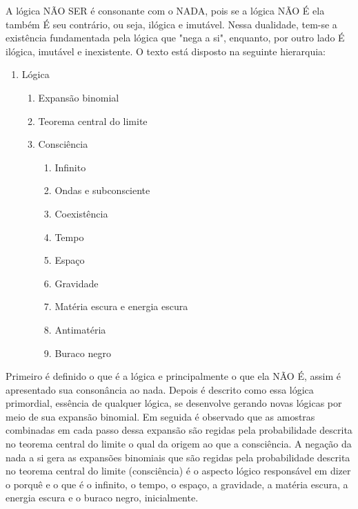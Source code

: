 A lógica NÃO SER é consonante com o NADA, pois se a lógica NÃO É ela também É seu contrário, ou seja, ilógica e imutável. Nessa dualidade, tem-se a existência fundamentada pela lógica que "nega a si", enquanto, por outro lado É ilógica, imutável e inexistente. O texto está disposto na seguinte hierarquia:
{\small
\begin{enumerate}[label*=\arabic*.]
   \item Lógica
   \begin{enumerate}[label*=\arabic*.]
	   \item Expansão binomial
	   \item Teorema central do limite
	   \item Consciência
		   \begin{enumerate}[label*=\arabic*.]
			   \item Infinito
			   \item Ondas e subconsciente
			   \item Coexistência
			   \item Tempo
			   \item Espaço
			   \item Gravidade
			   \item Matéria escura e energia escura
			   \item Antimatéria
			   \item Buraco negro
		   \end{enumerate}   
   \end{enumerate}
\end{enumerate}
}
Primeiro é definido o que é a lógica e principalmente o que ela NÃO É, assim é apresentado sua consonância ao nada. Depois é descrito como essa lógica primordial, essência de qualquer lógica, se desenvolve gerando novas lógicas por meio de sua expansão binomial. Em seguida é observado que as amostras combinadas em cada passo dessa expansão são regidas pela probabilidade descrita no teorema central do limite o qual da origem ao que a consciência. A negação da nada a si gera as expansões binomiais que são regidas pela probabilidade descrita no teorema central do limite (consciência) é o aspecto lógico responsável em dizer o porquê e o que é o infinito, o tempo, o espaço, a gravidade, a matéria escura, a energia escura e o buraco negro, inicialmente. 